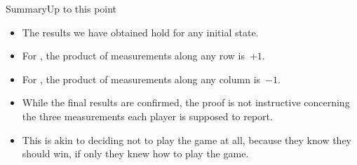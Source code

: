 \begin{frame}{Summary}{Up to this point}
\begin{itemize}[<+->]
    \item The results we have obtained hold for any initial state.
    \item For \Alice{}, the product of measurements along any row is~$+1$.
    \item For \Bob{}, the product of measurements along any column is~$-1$.
    \item While the final results are confirmed, the proof is not instructive concerning the three measurements each player is supposed to report.
    \item This is akin to deciding not to play the game at all, because they know they should win, if only they knew how to play the game.
\end{itemize}
    
\end{frame}

